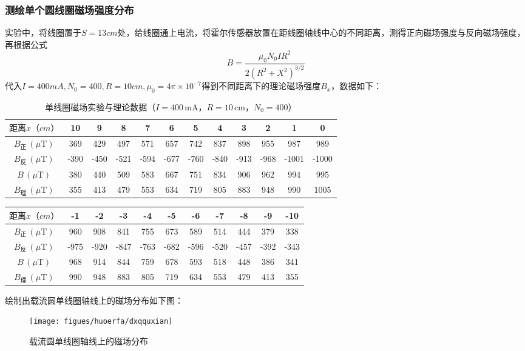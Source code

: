 \documentclass[]{../template/Report}%
\begin{document}
\begin{fullreportonly}
\subsubsection{测绘单个圆线圈磁场强度分布}
实验中，将线圈置于$S=13cm$处，给线圈通上电流，将霍尔传感器放置在距线圈轴线中心的不同距离，测得正向磁场强度与反向磁场强度，再根据公式
\[B = \frac{\mu_0 N_0  I  R^2}{2  (R^2 + X^2)^{3/2}}\]
代入$I=400mA,N_0=400,R=10cm,\mu_0 = 4\pi \times 10^{-7}$得到不同距离下的理论磁场强度$B_x$，数据如下：
\begin{table}[h]
    \centering
    \caption{单线圈磁场实验与理论数据（\( I = 400\,\text{mA} \)，\( R = 10\,\text{cm} \)，\( N_0 = 400 \)）}
    \begin{tabular}{c c c c c c c c c c c c}
        \toprule
        $距离x（cm）$ & 10 & 9 & 8 & 7 & 6 & 5 & 4 & 3 & 2 & 1 & 0 \\
        \midrule
        \( B_{\text{正}} \, (\mu\text{T}) \) & 369 & 429 & 497 & 571 & 657 & 742 & 837 & 898 & 955 & 987 & 989 \\
        \( B_{\text{反}} \, (\mu\text{T}) \) & -390 & -450 & -521 & -594 & -677 & -760 & -840 & -913 & -968 & -1001 & -1000 \\
        \( B \, (\mu\text{T}) \) & 380 & 440 & 509 & 583 & 667 & 751 & 834 & 906 & 962 & 994 & 995 \\
        \( B_{\text{理}} \, (\mu\text{T}) \) & 355 & 413 & 479 & 553 & 634 & 719 & 805 & 883 & 948 & 990 & 1005 \\
        \bottomrule
    \end{tabular}
    \label{tab:magnetic-field-1}
\end{table}
\begin{table}[h]
    \centering
    \begin{tabular}{c c c c c c c c c c c}
        \toprule
       $ 距离x（cm） $& -1 & -2 & -3 & -4 & -5 & -6 & -7 & -8 & -9 & -10 \\
        \midrule
        \( B_{\text{正}} \, (\mu\text{T}) \) & 960 & 908 & 841 & 755 & 673 & 589 & 514 & 444 & 379 & 338 \\
        \( B_{\text{反}} \, (\mu\text{T}) \) & -975 & -920 & -847 & -763 & -682 & -596 & -520 & -457 & -392 & -343 \\
        \( B \, (\mu\text{T}) \) & 968 & 914 & 844 & 759 & 678 & 593 & 518 & 448 & 386 & 341 \\
        \( B_{\text{理}} \, (\mu\text{T}) \) & 990 & 948 & 883 & 805 & 719 & 634 & 553 & 479 & 413 & 355 \\
        \bottomrule
    \end{tabular}
\end{table}
\clearpage
绘制出载流圆单线圈轴线上的磁场分布如下图：
\begin{figure}[!h]
    \begin{center}
        \texttt{[image: figues/huoerfa/dxqquxian]}
        \caption{载流圆单线圈轴线上的磁场分布}
    \end{center}
\end{figure}


\end{fullreportonly}
\end{document}
